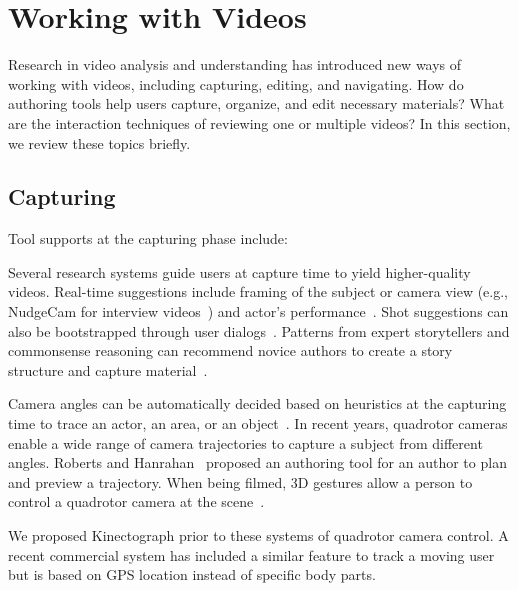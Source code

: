
\section{Working with Videos}
\label{related_videos}

Research in video analysis and understanding has introduced new ways of working with videos, including capturing, editing, and navigating. How do authoring tools help users capture, organize, and edit necessary materials? What are the interaction techniques of reviewing one or multiple videos? In this section, we review these topics briefly.


\subsection{Capturing}
Tool supports at the capturing phase include:

Several research systems guide users at capture time to yield higher-quality videos. Real-time suggestions include framing of the subject or camera view (e.g., NudgeCam for interview videos~\cite{Carter:2010}) and actor's performance~\cite{Heer:2004ba,Davis:2003cu}. Shot suggestions can also be bootstrapped through user dialogs~\cite{Adams:2005}.
%
Patterns from expert storytellers and commonsense reasoning can recommend novice authors to create a story structure and capture material~\cite{Barry:2003:MCC:957013.957152,Kim:2015:MSN:2702123.2702507}.

Camera angles can be automatically decided based on heuristics at the capturing time to trace an actor, an area, or an object~\cite{Ranjan:2008,Okumura:2011tr}.
%
In recent years, quadrotor cameras enable a wide range of camera trajectories to capture a subject from different angles. Roberts and Hanrahan~\cite{Roberts:2016:GDF:2897824.2925980} proposed an authoring tool for an author to plan and preview a trajectory. When being filmed, 3D gestures allow a person to control a quadrotor camera at the scene~\cite{Cauchard:2015:DME:2750858.2805823,Pfeil:2013:EGM:2449396.2449429}.

We proposed Kinectograph prior to these systems of quadrotor camera control. A recent commercial system has included a similar feature to track a moving user~\cite{HexoDrone} but is based on GPS location instead of specific body parts.

